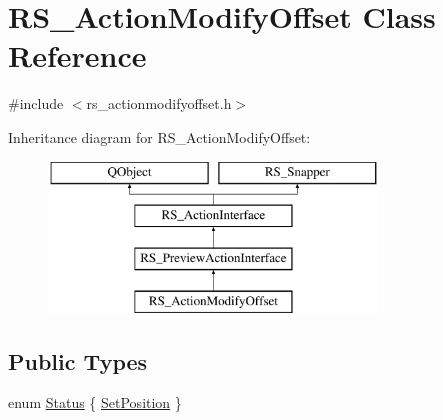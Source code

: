 \hypertarget{classRS__ActionModifyOffset}{\section{R\-S\-\_\-\-Action\-Modify\-Offset Class Reference}
\label{classRS__ActionModifyOffset}
}


{\ttfamily \#include $<$rs\-\_\-actionmodifyoffset.\-h$>$}

Inheritance diagram for R\-S\-\_\-\-Action\-Modify\-Offset\-:\begin{figure}[H]
\begin{center}
\leavevmode
\includegraphics[height=4.000000cm]{classRS__ActionModifyOffset}
\end{center}
\end{figure}
\subsection*{Public Types}
\begin{DoxyCompactItemize}
\item 
enum \hyperlink{classRS__ActionModifyOffset_a0c918df3c30f787f7ee634910306e9fa}{Status} \{ \hyperlink{classRS__ActionModifyOffset_a0c918df3c30f787f7ee634910306e9faaf0bd24afe3cba823034c304e27305431}{Set\-Position}
 \}
\end{DoxyCompactItemize}
